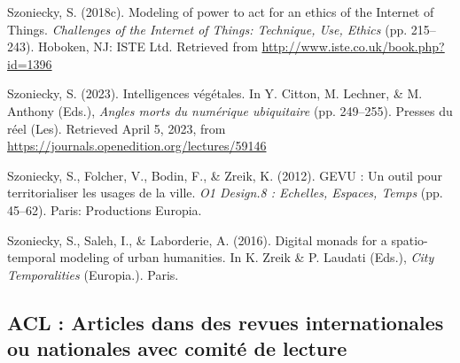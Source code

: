 \documentclass[
  a4paper,
  DIV=11,
  numbers=noendperiod]{scrreprt}
\newlength{\cslhangindent}
\newenvironment{CSLReferences}[2] %
 {\begin{list}{}{%
  \setlength{\itemindent}{0pt}
  \setlength{\leftmargin}{0pt}
  \setlength{\parsep}{0pt}
  \ifodd #1
   \setlength{\leftmargin}{\cslhangindent}
   \setlength{\itemindent}{-1\cslhangindent}
  \fi
  \setlength{\itemsep}{#2\baselineskip}}}
 {\end{list}}
\begin{document}
\begin{CSLReferences}{1}{0}
Szoniecky, S. (2018c). Modeling of power to act for an ethics of the
{Internet} of {Things}. \emph{Challenges of the {Internet} of {Things}:
{Technique}, {Use}, {Ethics}} (pp. 215--243). Hoboken, NJ: ISTE Ltd.
Retrieved from \url{http://www.iste.co.uk/book.php?id=1396}

Szoniecky, S. (2023). Intelligences végétales. In Y. Citton, M. Lechner,
\& M. Anthony (Eds.), \emph{Angles morts du numérique ubiquitaire} (pp.
249--255). Presses du réel (Les). Retrieved April 5, 2023, from
\url{https://journals.openedition.org/lectures/59146}

Szoniecky, S., Folcher, V., Bodin, F., \& Zreik, K. (2012). {GEVU} : Un
outil pour territorialiser les usages de la ville. \emph{O1 {Design}.8 :
{Echelles}, {Espaces}, {Temps}} (pp. 45--62). Paris: Productions
Europia.

Szoniecky, S., Saleh, I., \& Laborderie, A. (2016). Digital monads for a
spatio-temporal modeling of urban humanities. In K. Zreik \& P. Laudati
(Eds.), \emph{City {Temporalities}} (Europia.). Paris.

\end{CSLReferences}

\subsection{ACL : Articles dans des revues internationales ou nationales
avec comité de lecture}\label{sec-item299378}
\end{document}
